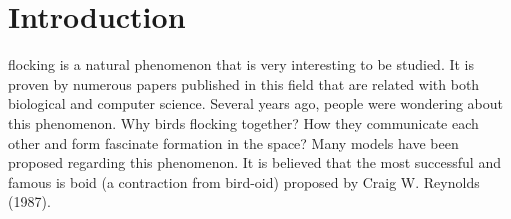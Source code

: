 \documentclass[journal,transmag]{IEEEtran}
\begin{document}
%
\IEEEpeerreviewmaketitle



\section{Introduction}
%
%
%
%
 flocking is a natural phenomenon that is very interesting to be
studied. It is proven by numerous papers published in this field that
are related with both biological and computer science. Several years
ago, people were wondering about this phenomenon. Why birds flocking together?
How they communicate each other and form fascinate formation in the space? Many models have been proposed regarding
this phenomenon. It is believed that the most successful and famous
is boid (a contraction from bird-oid) proposed by Craig W. Reynolds
(1987). 


%
%
\end{document}
